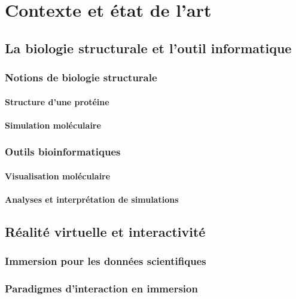 \chapter[La biologie structurale au sein d'environnements immersifs et interactifs]{Contexte et état de l'art}
\minitoc
\cleardoublepage

\section{La biologie structurale et l'outil informatique}

\subsection{Notions de biologie structurale}

\subsubsection{Structure d'une protéine}

\subsubsection{Simulation moléculaire}

\subsection{Outils bioinformatiques}

\subsubsection{Visualisation moléculaire}

\subsubsection{Analyses et interprétation de simulations}

\section{Réalité virtuelle et interactivité}

\subsection{Immersion pour les données scientifiques}

\subsection{Paradigmes d'interaction en immersion}

